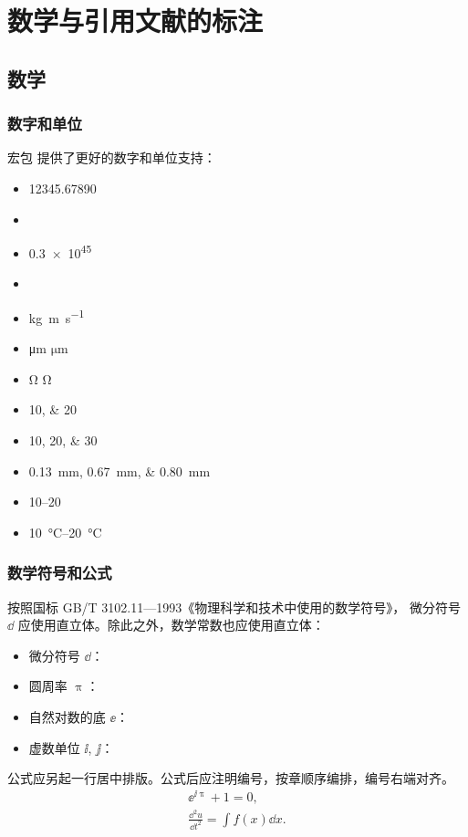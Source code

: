 \documentclass{sjtureport}
\begin{document}
\chapter{数学与引用文献的标注}

\section{数学}

\subsection{数字和单位}

宏包  提供了更好的数字和单位支持：
\begin{itemize}
	\item \num{12345.67890}
	\item {}
	\item \num{.3e45}
	\item {}
	\item \unit{kg.m.s^{-1}}
	\item \unit{\micro\meter} $\unit{\micro\meter}$
	\item \unit{\ohm} $\unit{\ohm}$
	\item \numlist{10;20}
	\item \numlist{10;20;30}
	\item \qtylist{0.13;0.67;0.80}{\milli\metre}
	\item \numrange{10}{20}
	\item \qtyrange{10}{20}{\degreeCelsius}
\end{itemize}

\subsection{数学符号和公式}

按照国标 GB/T 3102.11—1993《物理科学和技术中使用的数学符号》，
微分符号 $\dd$ 应使用直立体。除此之外，数学常数也应使用直立体：
\begin{itemize}
	\item 微分符号 $\dd$：
	\item 圆周率 $\uppi$：
	\item 自然对数的底 $\ee$：
	\item 虚数单位 $\ii$, $\jj$： 
\end{itemize}

公式应另起一行居中排版。公式后应注明编号，按章顺序编排，编号右端对齐。
\begin{gather}
	\ee^{\ii\uppi} + 1 = 0, \\
	\frac{\dd^2 u}{\dd t^2} = \int f(x) \dd x.
\end{gather}
\end{document}

